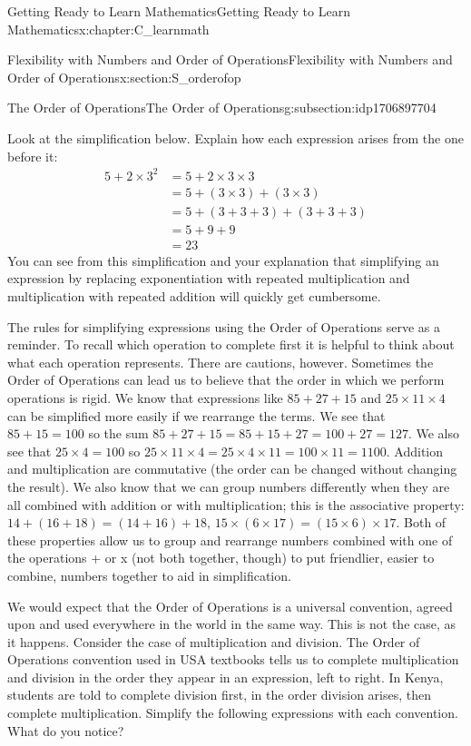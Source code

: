 \documentclass[oneside,10pt,]{book}
\numberwithin{equation}{chapter}
\newcommand{\amp}{&}
\begin{document}
\begin{chapterptx}{Getting Ready to Learn Mathematics}{}{Getting Ready to Learn Mathematics}{}{}{x:chapter:C_learnmath}
\begin{sectionptx}{Flexibility with Numbers and Order of Operations}{}{Flexibility with Numbers and Order of Operations}{}{}{x:section:S_orderofop}
\begin{subsectionptx}{The Order of Operations}{}{The Order of Operations}{}{}{g:subsection:idp1706897704}
\begin{equation*}
\end{equation*}
%
\par
Look at the simplification below. Explain how each expression arises from the one before it:%
\begin{align*}
5 + 2 \times 3^2 \amp = 5 + 2 \times 3 \times 3\\
\amp = 5 + (3 \times 3) + (3 \times 3)\\
\amp = 5 + (3 + 3 + 3) + (3 + 3 + 3)\\
\amp = 5 + 9 + 9\\
\amp = 23
\end{align*}
You can see from this simplification and your explanation that simplifying an expression by replacing exponentiation with repeated multiplication and multiplication with repeated addition will quickly get cumbersome.%
\par
The rules for simplifying expressions using the Order of Operations serve as a reminder. To recall which operation to complete first it is helpful to think about what each operation represents. There are cautions, however. Sometimes the Order of Operations can lead us to believe that the order in which we perform operations is rigid. We know that expressions like \(85 + 27 + 15\) and \(25 \times 11 \times 4\) can be simplified more easily if we rearrange the terms. We see that \(85 + 15 = 100\) so the sum \(85 + 27 + 15 = 85 + 15 + 27 = 100 + 27 = 127\). We also see that \(25 \times 4 = 100\) so \(25 \times 11 \times 4 = 25 \times 4 \times 11 = 100 \times 11 = 1100\). Addition and multiplication are commutative (the order can be changed without changing the result). We also know that we can group numbers differently when they are all combined with addition or with multiplication; this is the associative property: \(14 + (16 + 18) = (14 + 16) + 18\), \(15 \times (6 \times 17) = (15 \times 6) \times 17\). Both of these properties allow us to group and rearrange numbers combined with one of the operations + or x (not both together, though) to put friendlier, easier to combine, numbers together to aid in simplification.%
\par
We would expect that the Order of Operations is a universal convention, agreed upon and used everywhere in the world in the same way. This is not the case, as it happens. Consider the case of multiplication and division. The Order of Operations convention used in USA textbooks tells us to complete multiplication and division in the order they appear in an expression, left to right. In Kenya, students are told to complete division first, in the order division arises, then complete multiplication. Simplify the following expressions with each convention. What do you notice?%

\end{subsectionptx}
\end{sectionptx}
\end{chapterptx}
\end{document}
